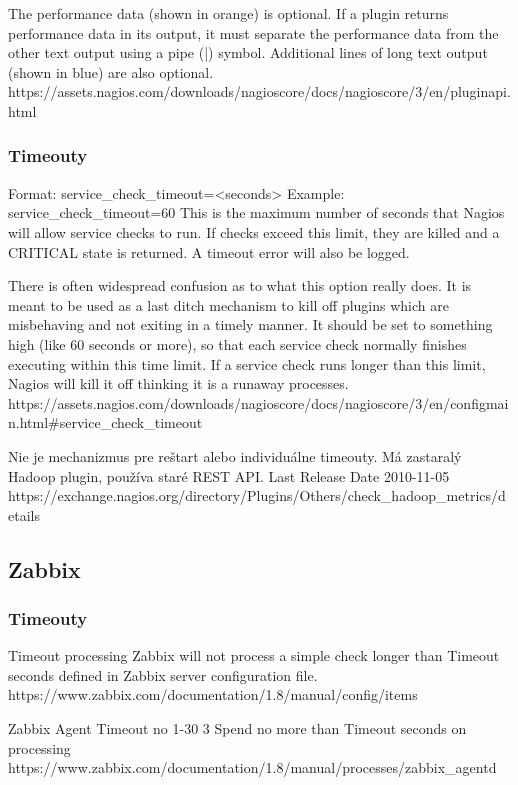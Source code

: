 \documentclass[11pt,final,oneside]{fithesis}
\begin{document}
The performance data (shown in orange) is optional. If a plugin returns performance data in its output, it must separate the performance data from the other text output using a pipe (|) symbol. Additional lines of long text output (shown in blue) are also optional.
https://assets.nagios.com/downloads/nagioscore/docs/nagioscore/3/en/pluginapi.html

\subsubsection{Timeouty}

Format:	service_check_timeout=<seconds>
Example:	service_check_timeout=60
This is the maximum number of seconds that Nagios will allow service checks to run. If checks exceed this limit, they are killed and a CRITICAL state is returned. A timeout error will also be logged.

There is often widespread confusion as to what this option really does. It is meant to be used as a last ditch mechanism to kill off plugins which are misbehaving and not exiting in a timely manner. It should be set to something high (like 60 seconds or more), so that each service check normally finishes executing within this time limit. If a service check runs longer than this limit, Nagios will kill it off thinking it is a runaway processes.
https://assets.nagios.com/downloads/nagioscore/docs/nagioscore/3/en/configmain.html#service_check_timeout



Nie je mechanizmus pre reštart alebo individuálne timeouty.
Má zastaralý Hadoop plugin, používa staré REST API.
Last Release Date 2010-11-05
https://exchange.nagios.org/directory/Plugins/Others/check_hadoop_metrics/details

\subsection{Zabbix}
\subsubsection{Timeouty}
Timeout processing
Zabbix will not process a simple check longer than Timeout seconds defined in Zabbix server configuration file.
https://www.zabbix.com/documentation/1.8/manual/config/items

Zabbix Agent
Timeout	 no	 1-30	3	Spend no more than Timeout seconds on processing
https://www.zabbix.com/documentation/1.8/manual/processes/zabbix_agentd
\end{document}
